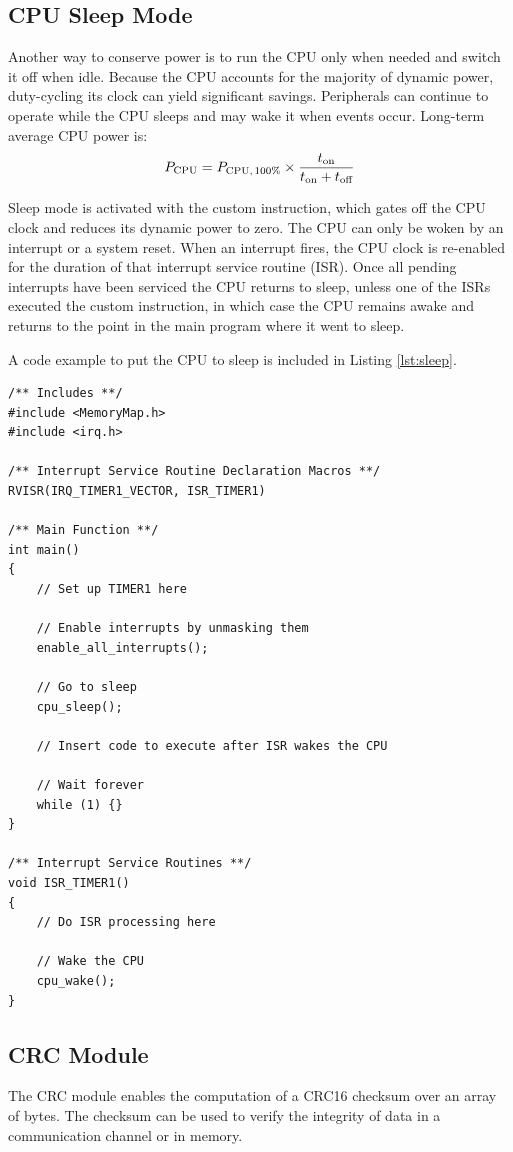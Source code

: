 \subsection{CPU Sleep Mode} \label{ss:sleep}

Another way to conserve power is to run the CPU only when needed and switch it off when idle. Because the CPU accounts for the majority of dynamic power, duty-cycling its clock can yield significant savings. Peripherals can continue to operate while the CPU sleeps and may wake it when events occur. Long-term average CPU power is:
$$P_\textrm{CPU} = P_\textrm{CPU,\,100\%} \times \frac{t_\textrm{on}}{t_\textrm{on} + t_\textrm{off}}$$

Sleep mode is activated with the custom  instruction, which gates off the CPU clock and reduces its dynamic power to zero. The CPU can only be woken by an interrupt or a system reset. When an interrupt fires, the CPU clock is re-enabled for the duration of that interrupt service routine (ISR). Once all pending interrupts have been serviced the CPU returns to sleep, unless one of the ISRs executed the custom  instruction, in which case the CPU remains awake and returns to the point in the main program where it went to sleep.

A code example to put the CPU to sleep is included in Listing \ref{lst:sleep}.

\begin{lstlisting}[style=customC, label=lst:sleep, caption={Example program to use CPU sleep mode}]
/** Includes **/
#include <MemoryMap.h>
#include <irq.h>

/** Interrupt Service Routine Declaration Macros **/
RVISR(IRQ_TIMER1_VECTOR, ISR_TIMER1)

/** Main Function **/
int main()
{
	// Set up TIMER1 here

	// Enable interrupts by unmasking them
	enable_all_interrupts();

	// Go to sleep
	cpu_sleep();

	// Insert code to execute after ISR wakes the CPU

	// Wait forever
	while (1) {}
}

/** Interrupt Service Routines **/
void ISR_TIMER1()
{
	// Do ISR processing here

	// Wake the CPU
	cpu_wake();
}
\end{lstlisting}



\subsection{CRC Module}
The CRC module enables the computation of a CRC16 checksum over an array of bytes. The checksum can be used to verify the integrity of data in a communication channel or in memory.

